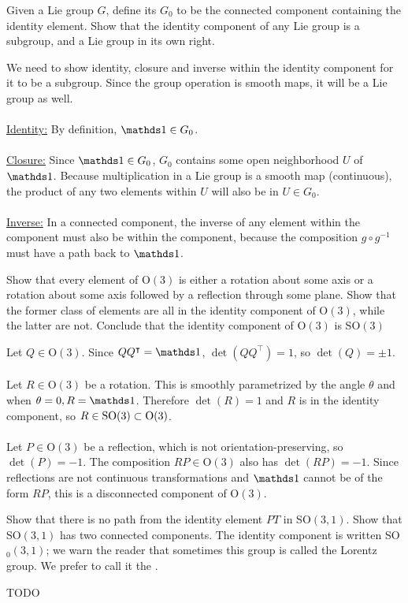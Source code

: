 \documentclass[10pt]{article}
\begin{document}
\begin{example}
	Given a Lie group $G$, define its  $G_0$ to be the connected component containing the identity element. Show that the identity component of any Lie group is a subgroup, and a Lie group in its own right.
\end{example}
\sol We need to show identity, closure and inverse within the identity component for it to be a subgroup. Since the group operation is smooth maps, it will be a Lie group as well.\\\\
\underline{Identity:}
By definition, $\id \in G_0$.\\\\
\underline{Closure:}
Since $\id \in G_0$, $G_0$ contains some open neighborhood $U$ of $\id$. Because multiplication in a Lie group is a smooth map (continuous), the product of any two elements within $U$ will also be in $U \in G_0$.\\\\
\underline{Inverse:}
In a connected component, the inverse of any element within the component must also be within the component, because the composition $g \circ g^{-1}$ must have a path back to $\id$.


\begin{example}
	Show that every element of O$(3)$ is either a rotation about some axis or a rotation about some axis followed by a reflection through some plane. Show that the former class of elements are all in the identity component of O$(3)$, while the latter are not. Conclude that the identity component of O$(3)$ is SO$(3)$
\end{example}
\sol Let $Q\in \text{O}(3)$. Since $QQ^\intercal = \id$, $\det (QQ^\intercal) = 1$, so $\det (Q) = \pm 1$.\\\\
Let $R \in \text{O}(3)$ be a rotation. This is smoothly parametrized by the angle $\theta$ and when $\theta = 0,R=\id$. Therefore $\det (R) = 1$ and $R$ is in the identity component, so $R \in \text{SO}(3) \subset \text{O}(3)$.\\\\
Let $P \in \text{O}(3)$ be a reflection, which is not orientation-preserving, so $\det (P) = -1$. The composition $RP \in \text{O}(3)$ also has $\det (RP) = -1$. Since reflections are not continuous transformations and $\id$ cannot be of the form $RP$, this is a disconnected component of O$(3)$.


\begin{example}
	Show that there is no path from the identity element $PT$ in SO$(3,1)$. Show that SO$(3,1)$ has two connected components. The identity component is written SO$_0(3,1)$; we warn the reader that sometimes this group is called the Lorentz group. We prefer to call it the .
\end{example}
\sol TODO
\end{document}
